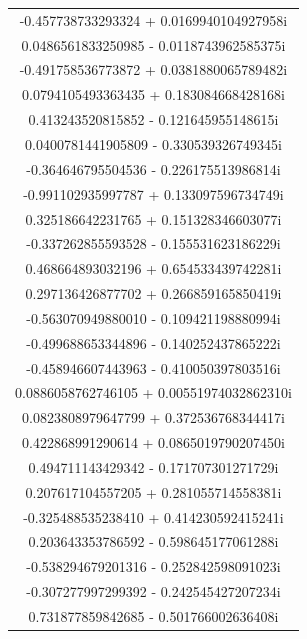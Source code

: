 \documentclass[12pt,a4paper,UTF8]{ctexart}
\begin{document}
\begin{enumerate}
\begin{longtable}{c}
              -0.457738733293324     +   0.0169940104927958i  \\
              0.0486561833250985     -   0.0118743962585375i  \\
              -0.491758536773872     +   0.0381880065789482i  \\
              0.0794105493363435     +   0.183084668428168i   \\
              0.413243520815852      -   0.121645955148615i   \\
              0.0400781441905809     -   0.330539326749345i   \\
              -0.364646795504536     -   0.226175513986814i   \\
              -0.991102935997787     +   0.133097596734749i   \\
              0.325186642231765      +   0.151328346603077i   \\
              -0.337262855593528     -   0.155531623186229i   \\
              0.468664893032196      +   0.654533439742281i   \\
              0.297136426877702      +   0.266859165850419i   \\
              -0.563070949880010     -   0.109421198880994i   \\
              -0.499688653344896     -   0.140252437865222i   \\
              -0.458946607443963     -   0.410050397803516i   \\
              0.0886058762746105     +   0.00551974032862310i \\
              0.0823808979647799     +   0.372536768344417i   \\
              0.422868991290614      +   0.0865019790207450i  \\
              0.494711143429342      -   0.171707301271729i   \\
              0.207617104557205      +   0.281055714558381i   \\
              -0.325488535238410     +   0.414230592415241i   \\
              0.203643353786592      -   0.598645177061288i   \\
              -0.538294679201316     -   0.252842598091023i   \\
              -0.307277997299392     -   0.242545427207234i   \\
              0.731877859842685      -   0.501766002636408i   \\

\end{longtable}
\end{enumerate}
\end{document}
